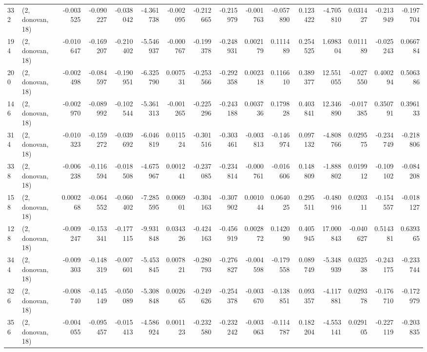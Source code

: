 \begin{tabular}{llrrrrrrrrrrrrrr}
332 &  (2, donovan, 18) &  -0.003525 & -0.090227 & -0.038042 &    -4.361738 &  -0.002095 &  -0.212665 &  -0.215979 & -0.001763 & -0.057890 &  0.123422 &   -4.705810 &  0.031427 & -0.213949 & -0.197704 \\
194 &  (2, donovan, 18) &  -0.010647 & -0.169207 & -0.210402 &    -5.546937 &  -0.000767 &  -0.199378 &  -0.248931 &  0.002179 &  0.111489 &  0.254525 &    1.698304 &  0.011189 & -0.025243 &  0.066784 \\
200 &  (2, donovan, 18) &  -0.002498 & -0.084597 & -0.190951 &    -6.325790 &   0.007531 &  -0.253566 &  -0.292358 &  0.002318 &  0.116610 &  0.389377 &   12.551055 & -0.027550 &  0.400294 &  0.506386 \\
146 &  (2, donovan, 18) &  -0.002970 & -0.089992 & -0.102544 &    -5.361313 &  -0.001265 &  -0.225296 &  -0.243188 &  0.003736 &  0.179828 &  0.403841 &   12.346890 & -0.017385 &  0.350791 &  0.396133 \\
314 &  (2, donovan, 18) &  -0.010323 & -0.159272 & -0.039692 &    -6.046819 &   0.011524 &  -0.301516 &  -0.303461 & -0.003813 & -0.146974 &  0.097132 &   -4.808766 &  0.029575 & -0.234749 & -0.218806 \\
338 &  (2, donovan, 18) &  -0.006238 & -0.116594 & -0.018508 &    -4.675967 &   0.001241 &  -0.237085 &  -0.234814 & -0.000761 & -0.016606 &  0.148809 &   -1.888802 &  0.019912 & -0.109102 & -0.084208 \\
158 &  (2, donovan, 18) &   0.000268 & -0.064552 & -0.060402 &    -7.285595 &   0.006901 &  -0.304163 &  -0.307902 &  0.001044 &  0.064025 &  0.295511 &   -0.480916 &  0.020311 & -0.154557 & -0.018127 \\
128 &  (2, donovan, 18) &  -0.009247 & -0.153341 & -0.177115 &    -9.931848 &   0.034326 &  -0.424163 &  -0.456919 &  0.002872 &  0.142090 &  0.405945 &   17.000843 & -0.040627 &  0.514381 &  0.639365 \\
344 &  (2, donovan, 18) &  -0.009303 & -0.148319 & -0.007601 &    -5.453845 &   0.007821 &  -0.280793 &  -0.276827 & -0.004598 & -0.179558 &  0.089749 &   -5.348939 &  0.032538 & -0.243175 & -0.233744 \\
326 &  (2, donovan, 18) &  -0.008740 & -0.145149 & -0.050089 &    -5.308848 &   0.002665 &  -0.249626 &  -0.254378 & -0.003670 & -0.138851 &  0.093357 &   -4.117881 &  0.029378 & -0.176710 & -0.172979 \\
356 &  (2, donovan, 18) &  -0.004055 & -0.095457 & -0.015413 &    -4.586924 &   0.001123 &  -0.232580 &  -0.232242 & -0.003063 & -0.114787 &  0.182204 &   -4.553141 &  0.029105 & -0.227119 & -0.203835 \\

\end{tabular}
